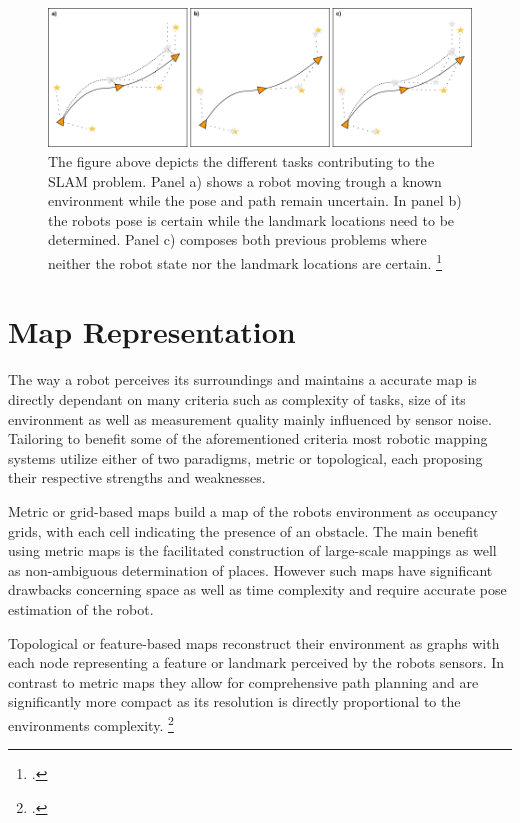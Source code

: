 \begin{figure}
	\centering
	\includegraphics[width=1.0\linewidth]{img/slamOverview}
	\caption{
		The figure above depicts the different tasks contributing to the SLAM problem. Panel a) shows a robot moving trough a known environment while the pose and path remain uncertain. In panel b) the robots pose is certain while the landmark locations need to be determined. Panel c) composes both previous problems where neither the robot state nor the landmark locations are certain. \footcite{durrantSlam2006}
	}
	\label{fig:slamOverview}
\end{figure}

\section{Map Representation}
The way a robot perceives its surroundings and maintains a accurate map is directly dependant on many criteria such as complexity of tasks, size of its environment as well as measurement quality mainly influenced by sensor noise. 
Tailoring to benefit some of the aforementioned criteria most robotic mapping systems utilize either of two paradigms, metric or topological, each proposing their respective strengths and weaknesses.

Metric or grid-based maps build a map of the robots environment as occupancy grids, with each cell indicating the presence of an obstacle. The main benefit using metric maps is the facilitated construction of large-scale mappings as well as non-ambiguous determination of places. However such maps have significant drawbacks concerning space as well as time complexity and require accurate pose estimation of the robot.

Topological or feature-based maps reconstruct their environment as graphs with each node representing a feature or landmark perceived by the robots sensors. In contrast to metric maps they allow for comprehensive path planning and are significantly more compact as its resolution is directly proportional to the environments complexity. \footcite{thrunMaps1998}


